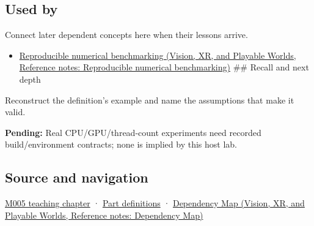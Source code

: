 \subsection{Used by}\label{appendix-5f1a2c3f97ff-used-by}

\hypertarget{appendix-5f1a2c3f97ff-used-by}{}

Connect later dependent concepts here when their lessons arrive.

\begin{itemize}
\tightlist
\item
  \href{../07-Vision-XR-and-Playable-Worlds/main.pdf\#nameddest=appendix-b9db93e28371}{Reproducible numerical benchmarking (Vision, XR, and Playable Worlds, Reference notes: Reproducible numerical benchmarking)} \#\# Recall and next depth
\end{itemize}

Reconstruct the definition's example and name the assumptions that make it valid.

\textbf{Pending:} Real CPU/GPU/thread-count experiments need recorded build/environment contracts; none is implied by this host lab.

\subsection{Source and navigation}\label{appendix-5f1a2c3f97ff-source-and-navigation}

\hypertarget{appendix-5f1a2c3f97ff-source-and-navigation}{}

\hyperref[01-foundations-i-ch001-when-arithmetic-meets-uncertainty]{M005 teaching chapter} · \hyperref[appendix-fd090d982a15-m005---parts-77-88]{Part definitions} · \href{../07-Vision-XR-and-Playable-Worlds/main.pdf\#nameddest=appendix-4ad47bdd269a}{Dependency Map (Vision, XR, and Playable Worlds, Reference notes: Dependency Map)}
